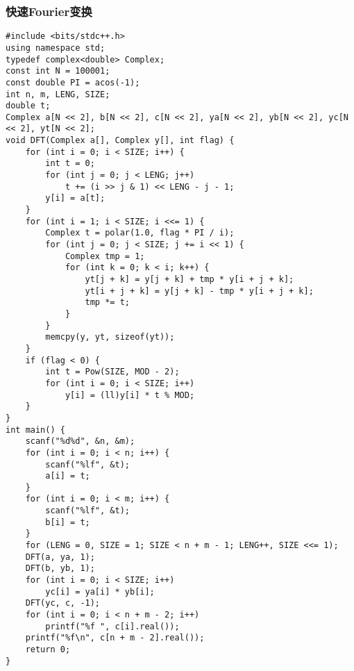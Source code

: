 \documentclass[a4paper]{article}
\begin{document}
\subsubsection{快速Fourier变换}
\begin{lstlisting}
#include <bits/stdc++.h>
using namespace std;
typedef complex<double> Complex;
const int N = 100001;
const double PI = acos(-1);
int n, m, LENG, SIZE;
double t;
Complex a[N << 2], b[N << 2], c[N << 2], ya[N << 2], yb[N << 2], yc[N << 2], yt[N << 2];
void DFT(Complex a[], Complex y[], int flag) {
    for (int i = 0; i < SIZE; i++) {
        int t = 0;
        for (int j = 0; j < LENG; j++)
            t += (i >> j & 1) << LENG - j - 1;
        y[i] = a[t];
    }
    for (int i = 1; i < SIZE; i <<= 1) {
        Complex t = polar(1.0, flag * PI / i);
        for (int j = 0; j < SIZE; j += i << 1) {
            Complex tmp = 1;
            for (int k = 0; k < i; k++) {
                yt[j + k] = y[j + k] + tmp * y[i + j + k];
                yt[i + j + k] = y[j + k] - tmp * y[i + j + k];
                tmp *= t;
            }
        }
        memcpy(y, yt, sizeof(yt));
    }
    if (flag < 0) {
        int t = Pow(SIZE, MOD - 2);
        for (int i = 0; i < SIZE; i++)
            y[i] = (ll)y[i] * t % MOD;
    }
}
int main() {
    scanf("%d%d", &n, &m);
    for (int i = 0; i < n; i++) {
        scanf("%lf", &t);
        a[i] = t;
    }
    for (int i = 0; i < m; i++) {
        scanf("%lf", &t);
        b[i] = t;
    }
    for (LENG = 0, SIZE = 1; SIZE < n + m - 1; LENG++, SIZE <<= 1);
    DFT(a, ya, 1);
    DFT(b, yb, 1);
    for (int i = 0; i < SIZE; i++)
        yc[i] = ya[i] * yb[i];
    DFT(yc, c, -1);
    for (int i = 0; i < n + m - 2; i++)
        printf("%f ", c[i].real());
    printf("%f\n", c[n + m - 2].real());
    return 0;
}
\end{lstlisting}
\end{document}
